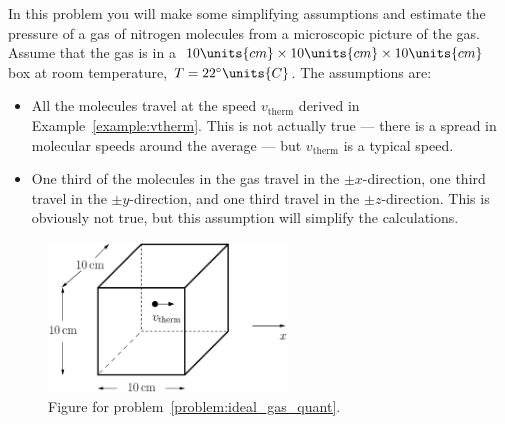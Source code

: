 \begin{problem}
  In this problem you will make some simplifying assumptions and estimate 
  the pressure of a gas of nitrogen molecules from a microscopic picture 
  of the gas.  Assume that the gas is in a $10\units{cm} \times 
  10\units{cm}\times 10\units{cm}$ box at room temperature, 
  $T = 22^\circ\units{C}$.  The assumptions are:
  \begin{itemize}
  \item All the molecules travel at the speed $v_\text{therm}$ derived 
  in Example~\ref{example:vtherm}.  This is 
  not actually true --- there is a spread in 
  molecular speeds around the average ---
  but $v_\text{therm}$ is a typical speed.
  \item One third of the molecules in the gas travel in the $\pm x$-direction,
  one third travel in the $\pm y$-direction, and one third travel in the 
  $\pm z$-direction.  This is obviously not true, but this assumption will
  simplify the calculations.
  \end{itemize}
 
  \begin{figure}[ht]
    \begin{center}
      \includegraphics[width=2.5in]{liquids_and_gases/ideal_gas_prob.eps}
      \caption{Figure for problem~\ref{problem:ideal_gas_quant}.}  
      \label{fig:ideal_gas_quant}
    \end{center}
  \end{figure}
  

\end{problem}

